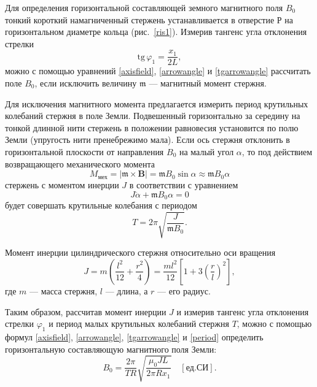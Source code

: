 \documentclass[a4paper, 12pt]{article}
\begin{document}
Для определения горизонтальной составляющей земного магнитного
поля $B_0$ тонкий короткий намагниченный стержень устанавливается в
отверстие Р на горизонтальном диаметре кольца (рис.~\ref{ris1}). Измерив тангенс угла отклонения стрелки
\begin{equation}\label{tgarrowangle}
\mathrm{tg}\,\varphi_1 = \frac{x_1}{2L},
\end{equation}
можно с помощью уравнений \eqref{axisfield}, \eqref{arrowangle} и \eqref{tgarrowangle} рассчитать поле $B_0$, если
исключить величину $\mathfrak{m}$ --- магнитный момент стержня.

Для исключения магнитного момента предлагается измерить период крутильных колебаний стержня в поле Земли. Подвешенный горизонтально за середину на тонкой длинной нити стержень в положении
равновесия установится по полю Земли (упругость нити пренебрежимо мала). Если ось стержня отклонить в горизонтальной плоскости от
направления $B_0$ на малый угол $\alpha$, то под действием возвращающего механического момента
\begin{equation}\label{mechmoment}
M_{мех} = |\mathbf{\mathfrak{m} \times B}| = \mathfrak{m} B_0 \sin{\alpha} \approx \mathfrak{m} B_0 \alpha
\end{equation}
стержень с моментом инерции $J$ в соответствии с уравнением
\begin{equation}\label{inertmomenteq}
J\ddot{\alpha} + \mathfrak{m} B_0 \alpha = 0
\end{equation}
будет совершать крутильные колебания с периодом
\begin{equation}\label{period}
T = 2\pi\sqrt{\frac{J}{\mathfrak{m}B_0}}.
\end{equation}

Момент инерции цилиндрического стержня относительно оси вращения
\begin{equation}\label{inertiamoment}
J = m\left(\frac{l^2}{12} + \frac{r^2}{4}\right) = \frac{ml^2}{12}\left[1 + 3\left(\frac{r}{l}\right)^2\right],
\end{equation}
где $m$ --- масса стержня, $l$ --- длина, а $r$ --- его радиус.

Таким образом, рассчитав момент инерции $J$ и измерив тангенс угла
отклонения стрелки $\varphi_1$ и период малых крутильных колебаний стержня $T$, можно с помощью формул \eqref{axisfield}, \eqref{arrowangle}, \eqref{tgarrowangle} и \eqref{period} определить горизонтальную составляющую магнитного поля Земли:
\begin{equation}\label{earthfield}
B_0 = \frac{2\pi}{TR}\sqrt{\frac{\mu_0 J L}{2\pi Rx_1}} \quad [ед. СИ].
\end{equation}
\end{document}
